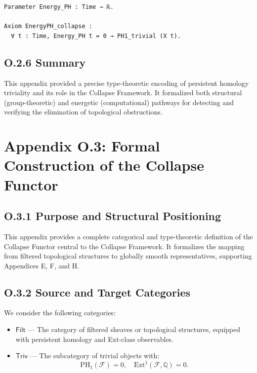 \documentclass[11pt]{article}
\begin{document}
\begin{lstlisting}[language=Coq]
Parameter Energy_PH : Time → ℝ.

Axiom EnergyPH_collapse :
  ∀ t : Time, Energy_PH t = 0 → PH1_trivial (X t).
\end{lstlisting}

\subsection*{O.2.6 Summary}

This appendix provided a precise type-theoretic encoding of persistent homology triviality and its role in the Collapse Framework.  
It formalized both structural (group-theoretic) and energetic (computational) pathways for detecting and verifying the elimination of topological obstructions.



\section*{Appendix O.3: Formal Construction of the Collapse Functor}

\subsection*{O.3.1 Purpose and Structural Positioning}

This appendix provides a complete categorical and type-theoretic definition of the Collapse Functor central to the Collapse Framework.  
It formalizes the mapping from filtered topological structures to globally smooth representatives, supporting Appendices E, F, and H.

\subsection*{O.3.2 Source and Target Categories}

We consider the following categories:

\begin{itemize}
  \item \( \mathsf{Filt} \) — The category of filtered sheaves or topological structures, equipped with persistent homology and Ext-class observables.
  \item \( \mathsf{Triv} \) — The subcategory of trivial objects with:
  \[
  \mathrm{PH}_1(\mathcal{F}) = 0,\quad \mathrm{Ext}^1(\mathcal{F}, \mathbb{Q}) = 0.
  \]
\end{itemize}
\end{document}
